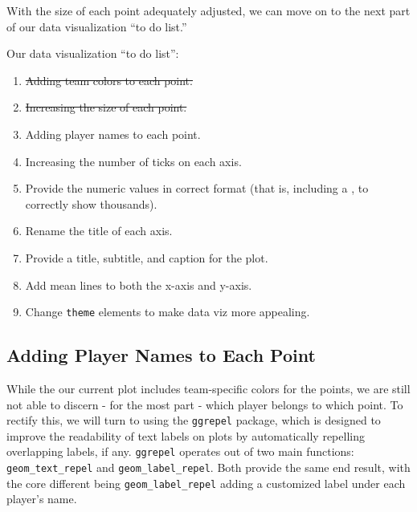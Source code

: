\documentclass[
  letterpaper,
]{krantz}
\begin{document}
With the size of each point adequately adjusted, we can move on to the
next part of our data visualization ``to do list.''

\begin{tcolorbox}[enhanced jigsaw, colback=white, leftrule=.75mm, breakable, colframe=quarto-callout-note-color-frame, bottomtitle=1mm, rightrule=.15mm, left=2mm, opacityback=0, bottomrule=.15mm, arc=.35mm, coltitle=black, colbacktitle=quarto-callout-note-color!10!white, toptitle=1mm, titlerule=0mm, title=\textcolor{quarto-callout-note-color}{\faInfo}\hspace{0.5em}{Note}, toprule=.15mm, opacitybacktitle=0.6]

Our data visualization ``to do list'':

\begin{enumerate}
\def\labelenumi{\arabic{enumi}.}
\item
  \st{Adding team colors to each point.}
\item
  \st{Increasing the size of each point.}
\item
  Adding player names to each point.
\item
  Increasing the number of ticks on each axis.
\item
  Provide the numeric values in correct format (that is, including a ,
  to correctly show thousands).
\item
  Rename the title of each axis.
\item
  Provide a title, subtitle, and caption for the plot.
\item
  Add mean lines to both the x-axis and y-axis.
\item
  Change \texttt{theme} elements to make data viz more appealing.
\end{enumerate}

\end{tcolorbox}

\hypertarget{adding-player-names-to-each-point}{%
\subsection{Adding Player Names to Each
Point}\label{adding-player-names-to-each-point}}

While the our current plot includes team-specific colors for the points,
we are still not able to discern - for the most part - which player
belongs to which point. To rectify this, we will turn to using the
\texttt{ggrepel} package, which is designed to improve the readability
of text labels on plots by automatically repelling overlapping labels,
if any. \texttt{ggrepel} operates out of two main functions:
\texttt{geom\_text\_repel} and \texttt{geom\_label\_repel}. Both provide
the same end result, with the core different being
\texttt{geom\_label\_repel} adding a customized label under each
player's name.
\end{document}
